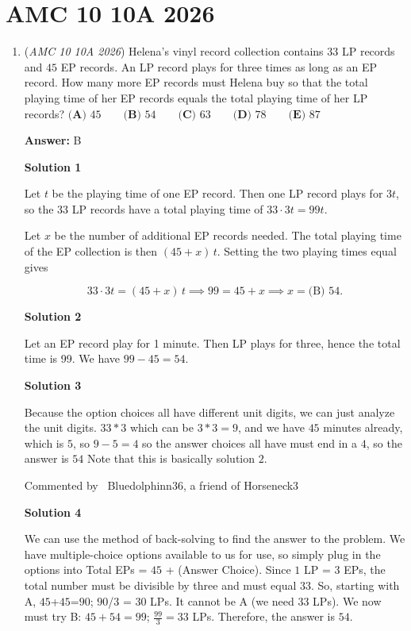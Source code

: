 \section{AMC 10 10A 2026}
        \begin{enumerate}
        	\item (\textit{AMC 10 10A 2026}) Helena's vinyl record collection contains $33$ LP records and $45$ EP records. An LP record plays for three times as long as an EP record. How many more EP records must Helena buy so that the total playing time of her EP records equals the total playing time of her LP records?
$\textbf{(A) } 45 \qquad \textbf{(B) } 54 \qquad \textbf{(C) } 63 \qquad \textbf{(D) } 78 \qquad \textbf{(E) } 87$

 \textbf{Answer: }B



\textbf{Solution 1}

Let $t$ be the playing time of one EP record. Then one LP record plays for $3t$, so the 33 LP records have a total playing time of $33 \cdot 3t = 99t$.

 Let $x$ be the number of additional EP records needed. The total playing time of the EP collection is then $(45 + x)\,t$. Setting the two playing times equal gives

 
 \[33 \cdot 3t = (45 + x)\,t \implies 99 = 45 + x \implies x = \boxed{\text{(B) } 54}.\]




\textbf{Solution 2}

Let an EP record play for 1 minute. Then LP plays for three, hence the total time is 99. We have $99-45 = \boxed{54}$.

 



\textbf{Solution 3}

Because the option choices all have different unit digits, we can just analyze the unit digits. $33*3$ which can be $3*3=9$, and we have $45$ minutes already, which is $5$, so $9-5=4$ so the answer choices all have must end in a $4$, so the answer is $\boxed{54}$ Note that this is basically solution $2$.

 Commented by ~Bluedolphinn36, a friend of Horseneck3

 



\textbf{Solution 4}

We can use the method of back-solving to find the answer to the problem. We have multiple-choice options available to us for use, so simply plug in the options into Total EPs = $45$ + (Answer Choice). Since $1$ LP = $3$ EPs, the total number must be divisible by three and must equal $33$. So, starting with A, $45$+$45$=$90$; $90$/$3$ = $30$ LPs. It cannot be A (we need $33$ LPs). We now must try B: $45+54=99$; $\frac{99}{3} = 33$ LPs. Therefore, the answer is $\boxed{54}$.


\end{enumerate}
